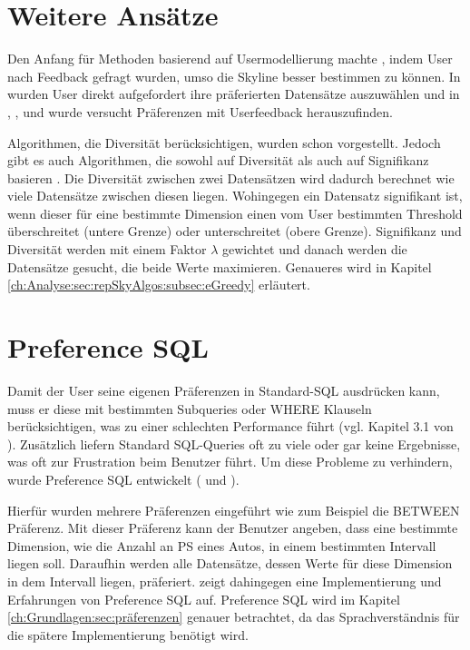 \section{Weitere Ansätze}
\label{ch:Forschungsstand:sec:userModel}
Den Anfang für Methoden basierend auf Usermodellierung machte \cite{948}, indem User nach Feedback gefragt wurden, umso die Skyline besser bestimmen zu können.
In \cite{Lofi10efficientcomputation} wurden User direkt aufgefordert ihre präferierten Datensätze auszuwählen und in \cite{lee2008optimal}, \cite{Mindolin:2009:DRI:1687627.1687697}, \cite{Mindolin:2011:PEP:1969331.1969354} und \cite{Zhao10callto} wurde versucht Präferenzen mit Userfeedback herauszufinden.

Algorithmen, die Diversität berücksichtigen, wurden schon vorgestellt. Jedoch gibt es auch Algorithmen, die sowohl auf Diversität als auch auf Signifikanz basieren \cite{magnani2014taking}. Die Diversität zwischen zwei Datensätzen wird dadurch berechnet wie viele Datensätze zwischen diesen liegen. Wohingegen ein Datensatz signifikant ist, wenn dieser für eine bestimmte Dimension einen vom User bestimmten Threshold überschreitet (untere Grenze) oder unterschreitet (obere Grenze).
Signifikanz und Diversität werden mit einem Faktor $\lambda$ gewichtet und danach werden die Datensätze gesucht, die beide Werte maximieren. Genaueres wird in Kapitel \ref{ch:Analyse:sec:repSkyAlgos:subsec:eGreedy} erläutert.
\section{Preference SQL}
\label{ch:Forschungsstand:sec:prefSQL}
Damit der User seine eigenen Präferenzen in Standard-SQL ausdrücken kann, muss er diese mit bestimmten Subqueries oder WHERE Klauseln berücksichtigen, was zu einer schlechten Performance führt (vgl. Kapitel 3.1 von \cite{borzsony2001skyline}). Zusätzlich liefern Standard SQL-Queries oft zu viele oder gar keine Ergebnisse, was oft zur Frustration beim Benutzer führt. Um diese Probleme zu verhindern, wurde Preference SQL entwickelt (\cite{kiessling2002foundations} und \cite{kiessling2011preference}).

Hierfür wurden mehrere Präferenzen eingeführt wie zum Beispiel die BETWEEN Präferenz. Mit dieser Präferenz kann der Benutzer angeben, dass eine bestimmte Dimension, wie die Anzahl an PS eines Autos, in einem bestimmten Intervall liegen soll. Daraufhin werden alle Datensätze, dessen Werte für diese Dimension in dem Intervall liegen, präferiert. \cite{kiessling2002preference} zeigt dahingegen eine Implementierung und Erfahrungen von Preference SQL auf. 
Preference SQL wird im Kapitel \ref{ch:Grundlagen:sec:präferenzen} genauer betrachtet, da das Sprachverständnis für die spätere Implementierung benötigt wird.
